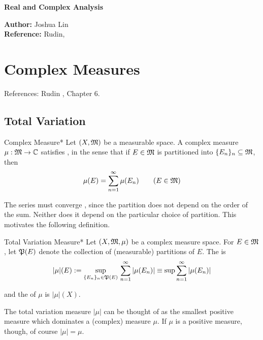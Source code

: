 




\begin{Large}
    \textsf{\textbf{Real and Complex Analysis}}
\end{Large}

\vspace{1ex}

\textsf{\textbf{Author:}} Joshua Lin \\
\textsf{\textbf{Reference:}} Rudin, 

\vspace{2ex}

\section{Complex Measures}

References: Rudin , Chapter 6. 
\stdvspace

\subsection{Total Variation}

\begin{definition}{Complex Measure}*
    Let $(X, \mathfrak{M})$ be a measurable space. A complex measure $\mu : \mathfrak{M} \to \mathbb{C}$ satisfies , in the sense that if $E \in \mathfrak{M}$ is partitioned into $\{E_n\}_{n} \subseteq \mathfrak{M}$, then 
    $$
        \mu(E) = \sum_{n=1}^\infty \mu(E_n)
        \qquad (E \in \mathfrak{M})
    $$
\end{definition}

The series must converge , since the partition does not depend on the order of the sum. Neither does it depend on the particular choice of partition. This motivates the following definition. 

\begin{definition}{Total Variation Measure}*
    Let $(X, \mathfrak{M}, \mu)$ be a complex measure space. For $E \in \mathfrak{M}$, let $\mathfrak{P}(E)$ denote the collection of (measurable) partitions of $E$. The  is
    $$
        |\mu|(E) := \sup_{\{E_n\}_n \in \mathfrak{P}(E)} \, \sum_{n=1}^\infty |\mu(E_n)|
        \equiv \sup \sum_{n=1}^\infty |\mu(E_n)|
    $$

    and the  of $\mu$ is $|\mu|(X)$. 
\end{definition}

The total variation measure $|\mu|$ can be thought of as the smallest positive measure which dominates a (complex) measure $\mu$. If $\mu$ is a positive measure, though, of course $|\mu| = \mu$. 
\stdvspace

